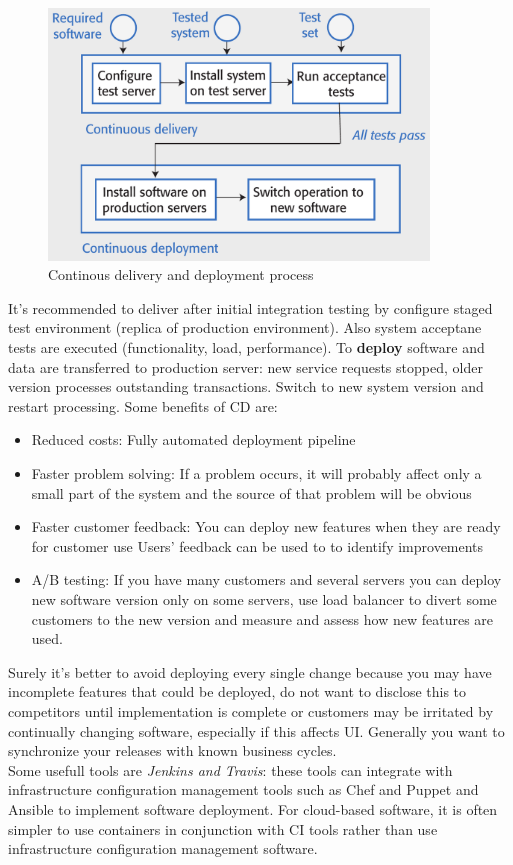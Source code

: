 \documentclass[10pt,a4paper]{report}
\begin{document}
\begin{figure}[h]
	\centering
	\includegraphics[width=0.9\textwidth]{image101}
	\caption{Continous delivery and deployment process}
	\label{image101}
\end{figure} 
It's recommended to deliver after initial integration testing by configure staged test environment (replica of production environment). Also system acceptane tests are executed (functionality, load, performance).
To \textbf{deploy} software and data are transferred to production server: new service requests stopped, older
version processes outstanding transactions. Switch to new system version and restart processing.
Some benefits of CD are:
\begin{itemize}
	\item Reduced costs: Fully automated deployment pipeline
	\item Faster problem solving: If a problem occurs, it will probably affect only a small part of the
	system and the source of that problem will be obvious
	\item Faster customer feedback:	You can deploy new features when they are ready for customer use
	Users’ feedback can be used to to identify improvements
	\item A/B testing: If you have many customers and several servers you can deploy new software version only on some servers, use load balancer to divert some customers to the new version and  measure and assess how new features are used.
\end{itemize}
Surely it's better to avoid deploying every single change because you may have incomplete features that could be deployed, do not want to disclose this to competitors until implementation is complete or customers may be irritated by continually changing software, especially if this affects UI. Generally you want to synchronize your releases with known business cycles.\\
Some usefull tools are \textit{Jenkins and Travis}: these tools can integrate with infrastructure configuration
management tools such as Chef and Puppet and Ansible to implement software deployment. For cloud-based software, it is often simpler to use containers in conjunction with CI tools rather than use infrastructure configuration management software.
\end{document}
